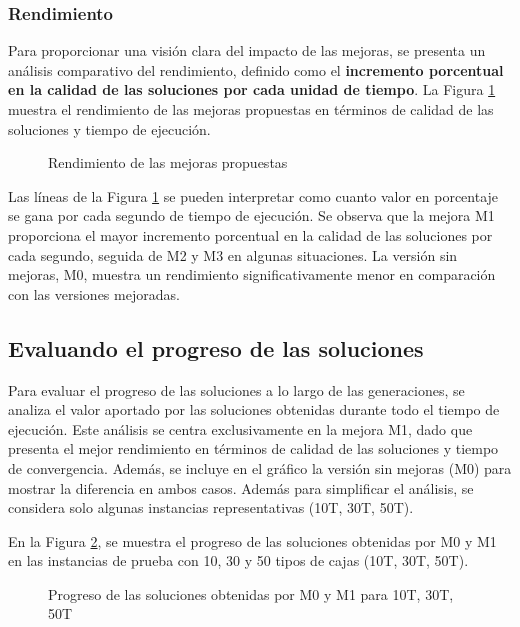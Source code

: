\documentclass[openany]{article}
\begin{document}
\subsubsection{Rendimiento}

Para proporcionar una visión clara del impacto de las mejoras, se presenta un análisis comparativo del rendimiento, definido como el \textbf{incremento porcentual en la calidad de las soluciones por cada unidad de tiempo}. La Figura \ref{fig:rendimiento} muestra el rendimiento de las mejoras propuestas en términos de calidad de las soluciones y tiempo de ejecución.

\begin{figure}[H]
    \centering
    
    \caption{Rendimiento de las mejoras propuestas}
    \label{fig:rendimiento}
\end{figure}

Las líneas de la Figura \ref{fig:rendimiento} se pueden interpretar como cuanto valor en porcentaje se gana por cada segundo de tiempo de ejecución. Se observa que la mejora M1 proporciona el mayor incremento porcentual en la calidad de las soluciones por cada segundo, seguida de M2 y M3 en algunas situaciones. La versión sin mejoras, M0, muestra un rendimiento significativamente menor en comparación con las versiones mejoradas.

\subsection{Evaluando el progreso de las soluciones}

Para evaluar el progreso de las soluciones a lo largo de las generaciones, se analiza el valor aportado por las soluciones obtenidas durante todo el tiempo de ejecución. Este análisis se centra exclusivamente en la mejora M1, dado que presenta el mejor rendimiento en términos de calidad de las soluciones y tiempo de convergencia. Además, se incluye en el gráfico la versión sin mejoras (M0) para mostrar la diferencia en ambos casos. Además para simplificar el análisis, se considera solo algunas instancias representativas (10T, 30T, 50T).

En la Figura \ref{fig:progreso}, se muestra el progreso de las soluciones obtenidas por M0 y M1 en las instancias de prueba con 10, 30 y 50 tipos de cajas (10T, 30T, 50T).

\begin{figure}[H]
    \centering
    
    \caption{Progreso de las soluciones obtenidas por M0 y M1 para 10T, 30T, 50T}
    \label{fig:progreso}
\end{figure}
\end{document}

